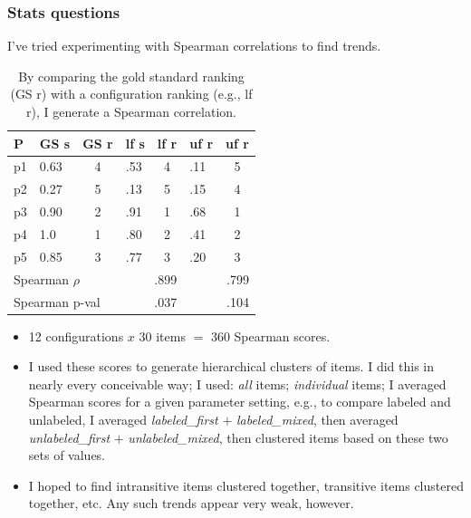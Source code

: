 \documentclass[xcolor={dvipsnames}]{beamer}
\begin{document}
\begin{frame}
\frametitle{Stats questions}
\scriptsize
\medskip

I've tried experimenting with Spearman correlations to find trends.

\begingroup
\setlength{\tabcolsep}{5pt} %
\begin{table}
\tiny
\begin{center}
\begin{tabular}{|l||l|c||l|c||l|c|}
\hline
P & \tiny{GS s} & \tiny{GS r} & \tiny{lf s} & \tiny{lf r} & \tiny{uf r} & \tiny{uf r} \\
\hline
p1 & 0.63 & 4 & .53 & 4 & .11 & 5 \\
\hline
p2 & 0.27 & 5 & .13 & 5 & .15 & 4 \\
\hline
p3 & 0.90 & 2 & .91 & 1 & .68 & 1 \\
\hline
p4 & 1.0 & 1 & .80 & 2 & .41 & 2 \\
\hline
p5 & 0.85 & 3 & .77 & 3 & .20 & 3 \\
\hline
\hline
\multicolumn{3}{|l||}{Spearman $\rho$} & \multicolumn{2}{r||}{.899} & \multicolumn{2}{r|}{.799} \\
\hline
\multicolumn{3}{|l||}{Spearman p-val} & \multicolumn{2}{r||}{.037} & \multicolumn{2}{r|}{.104}  \\
\hline
\end{tabular}
\caption{\scriptsize \label{tab:spearman} By comparing the gold standard ranking (GS r) with a configuration ranking (e.g., lf r), I generate a Spearman correlation.}
\end{center}
\end{table}
\endgroup

\vspace{-4ex}
\begin{itemize}
\item 12 configurations $x$ 30 items $=$ 360 Spearman scores.
\item I used these scores to generate hierarchical clusters of items. I did this in nearly every conceivable way; I used: \textit{all} items; \textit{individual} items; I averaged Spearman scores for a given parameter setting, e.g., to compare labeled and unlabeled, I averaged \textit{labeled\_first} $+$ \textit{labeled\_mixed}, then averaged \textit{unlabeled\_first} $+$ \textit{unlabeled\_mixed}, then clustered items based on these two sets of values.
\item I hoped to find intransitive items clustered together, transitive items clustered together, etc. Any such trends appear very weak, however.

\end{itemize}

\end{frame}
\end{document}
